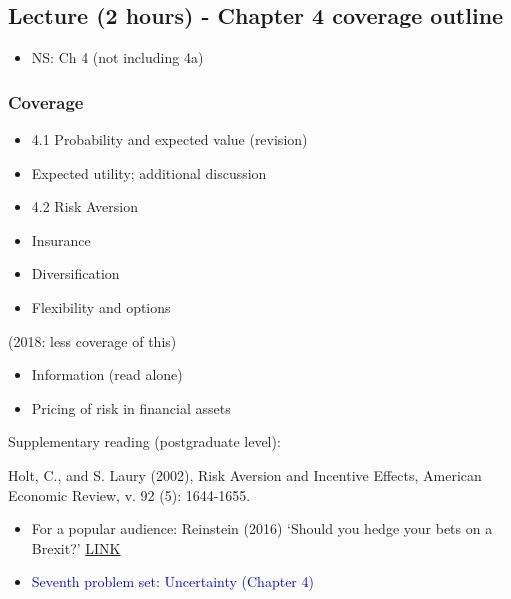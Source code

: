 \documentclass[]{article}
\providecommand{\tightlist}{%
  \setlength{\itemsep}{0pt}\setlength{\parskip}{0pt}}
\begin{document}
\hypertarget{lecture-2-hours---chapter-4-coverage-outline}{%
\subsection{Lecture (2 hours) - Chapter 4 coverage outline}\label{lecture-2-hours---chapter-4-coverage-outline}}

\begin{itemize}
\tightlist
\item
  NS: Ch 4 (not including 4a)
\end{itemize}

\hypertarget{coverage}{%
\subsubsection{Coverage}\label{coverage}}

\begin{itemize}
\tightlist
\item
  4.1 Probability and expected value (revision)
\item
  Expected utility; additional discussion
\item
  4.2 Risk Aversion
\item
  Insurance
\item
  Diversification
\item
  Flexibility and options
\end{itemize}

(2018: less coverage of this)

\begin{itemize}
\tightlist
\item
  Information (read alone)
\item
  Pricing of risk in financial assets
\end{itemize}

Supplementary reading (postgraduate level):

Holt, C., and S. Laury (2002), Risk Aversion and Incentive Effects, American Economic Review, v. 92 (5): 1644-1655.

\begin{itemize}
\item
  For a popular audience: Reinstein (2016) `Should you hedge your bets on a Brexit?' \href{https://davidreinstein.wordpress.com/2016/06/19/should-you-hedge-your-bets-on-a-brexit/}{LINK}
\item
  \textcolor{blue}{Seventh problem set: Uncertainty (Chapter 4)}
\end{itemize}
\end{document}
